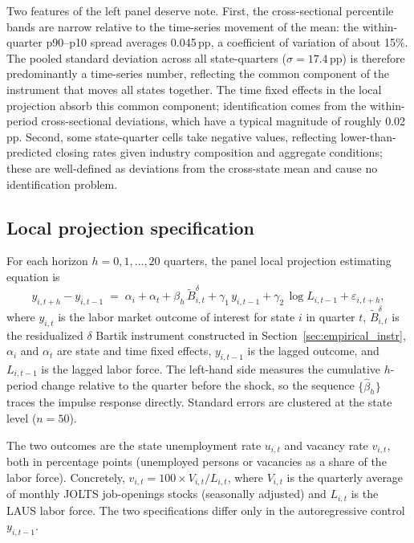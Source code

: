 \documentclass[authoryear, review, 12pt]{elsarticle}
\begin{document}
	Two features of the left panel deserve note.  First, the
	cross-sectional percentile bands are narrow relative to the
	time-series movement of the mean: the within-quarter p90--p10 spread
	averages 0.045\,pp, a coefficient of variation of about 15\%.  The
	pooled standard deviation across all state-quarters ($\hat{\sigma} =
	17.4$\,pp) is therefore predominantly a time-series number, reflecting
	the common component of the instrument that moves all states together.
	The time fixed effects in the local projection absorb this common
	component; identification comes from the within-period cross-sectional
	deviations, which have a typical magnitude of roughly 0.02\,pp.
	Second, some state-quarter cells take negative values, reflecting
	lower-than-predicted closing rates given industry composition and
	aggregate conditions; these are well-defined as deviations from the
	cross-state mean and cause no identification problem.

	\subsection{Local projection specification}\label{sec:empirical_lp}

	For each horizon $h=0,1,\ldots,20$ quarters, the panel local projection
	estimating equation is
	\begin{equation}\label{eq:lp}
		y_{i,t+h} - y_{i,t-1}
		\;=\;
		\alpha_i + \alpha_t
		+ \beta_h\,\tilde{B}^{\delta}_{i,t}
		+ \gamma_1\,y_{i,t-1}
		+ \gamma_2\,\log L_{i,t-1}
		+ \varepsilon_{i,t+h},
	\end{equation}
	where $y_{i,t}$ is the labor market outcome of interest for state $i$ in quarter $t$,
	$\tilde{B}^{\delta}_{i,t}$ is the residualized $\delta$ Bartik instrument
	constructed in Section~\ref{sec:empirical_instr}, $\alpha_i$ and
	$\alpha_t$ are state and time fixed effects, $y_{i,t-1}$ is the lagged
	outcome, and $L_{i,t-1}$ is the lagged labor force.  The left-hand side
	measures the cumulative $h$-period change relative to the quarter before
	the shock, so the sequence $\{\hat\beta_h\}$ traces the impulse response
	directly.  Standard errors are clustered at the state level ($n=50$).

	The two outcomes are the state unemployment rate $u_{i,t}$ and vacancy
	rate $v_{i,t}$, both in percentage points (unemployed persons or
	vacancies as a share of the labor force).  Concretely,
	$v_{i,t} = 100 \times V_{i,t}/L_{i,t}$, where $V_{i,t}$ is the
	quarterly average of monthly JOLTS job-openings stocks (seasonally
	adjusted) and $L_{i,t}$ is the LAUS labor force.  The two
	specifications differ only in the autoregressive control $y_{i,t-1}$.
\end{document}
